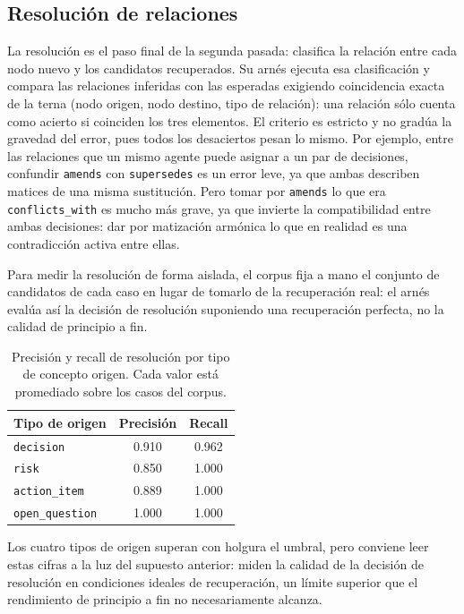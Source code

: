 \subsection{Resolución de relaciones}

La resolución es el paso final de la segunda pasada: clasifica la relación entre cada nodo nuevo y
los candidatos recuperados. Su arnés ejecuta esa clasificación y compara las relaciones inferidas
con las esperadas exigiendo coincidencia exacta de la terna (nodo origen, nodo destino, tipo de
relación): una relación sólo cuenta como acierto si coinciden los tres elementos. El criterio es
estricto y no gradúa la gravedad del error, pues todos los desaciertos pesan lo mismo. Por ejemplo,
entre las relaciones que un mismo agente puede asignar a un par de decisiones, confundir
\texttt{amends} con \texttt{supersedes} es un error leve, ya que ambas describen matices de una
misma sustitución. Pero tomar por \texttt{amends} lo que era \texttt{conflicts\_with} es mucho más
grave, ya que invierte la compatibilidad entre ambas decisiones: dar por matización armónica lo que
en realidad es una contradicción activa entre ellas.

Para medir la resolución de forma aislada, el corpus fija a mano el conjunto de candidatos
de cada caso en lugar de tomarlo de la recuperación real: el arnés evalúa así la decisión de
resolución suponiendo una recuperación perfecta, no la calidad de principio a fin.

\begin{table}[H]
  \centering
  \begin{tabular}{lcc}
    \toprule
    \textbf{Tipo de origen} & \textbf{Precisión} & \textbf{Recall} \\
    \midrule
    \texttt{decision}       & 0.910 & 0.962 \\
    \texttt{risk}           & 0.850 & 1.000 \\
    \texttt{action\_item}   & 0.889 & 1.000 \\
    \texttt{open\_question} & 1.000 & 1.000 \\
    \bottomrule
  \end{tabular}
  \caption{Precisión y recall de resolución por tipo de concepto origen. Cada valor está
           promediado sobre los casos del corpus.}
  \label{tab:eval-resolution}
\end{table}

Los cuatro tipos de origen superan con holgura el umbral, pero conviene leer estas cifras a la luz
del supuesto anterior: miden la calidad de la decisión de resolución en condiciones ideales de
recuperación, un límite superior que el rendimiento de principio a fin no necesariamente alcanza.


